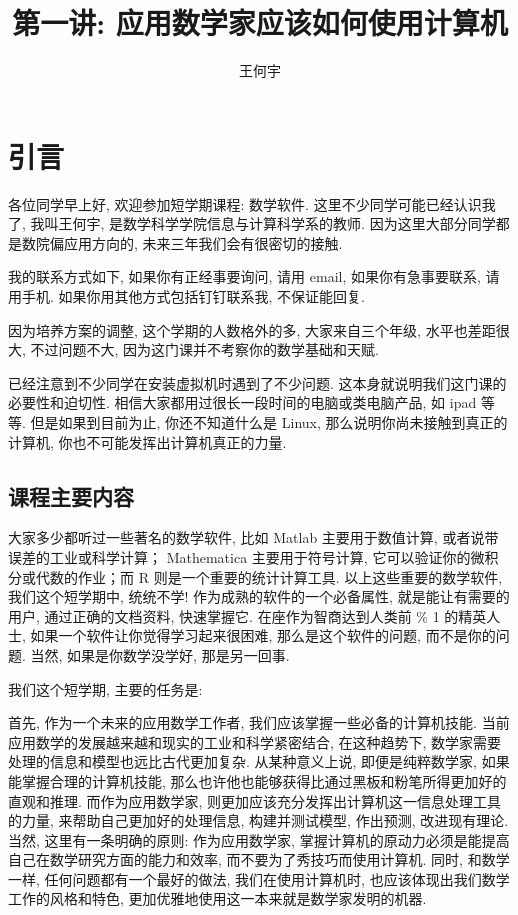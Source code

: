 \documentclass[a4paper]{ctexart}
\title{第一讲: 应用数学家应该如何使用计算机}
\author{王何宇}
\date{}
\begin{document}
\maketitle
\pagestyle{empty}

\section{引言}
各位同学早上好, 欢迎参加短学期课程: 数学软件. 这里不少同学可能已经认识我了,
我叫王何宇, 是数学科学学院信息与计算科学系的教师. 因为这里大部分同学都是数院偏应用方向的,
未来三年我们会有很密切的接触.

我的联系方式如下, 如果你有正经事要询问, 请用 email, 如果你有急事要联系, 请用手机.
如果你用其他方式包括钉钉联系我, 不保证能回复.   

因为培养方案的调整, 这个学期的人数格外的多, 大家来自三个年级, 水平也差距很大, 不过问题不大,
因为这门课并不考察你的数学基础和天赋.

已经注意到不少同学在安装虚拟机时遇到了不少问题. 这本身就说明我们这门课的必要性和迫切性.
相信大家都用过很长一段时间的电脑或类电脑产品, 如 ipad 等等. 但是如果到目前为止, 你还不知道什么是 Linux,
那么说明你尚未接触到真正的计算机, 你也不可能发挥出计算机真正的力量.

\subsection{课程主要内容}

大家多少都听过一些著名的数学软件, 比如 Matlab 主要用于数值计算, 或者说带误差的工业或科学计算；
Mathematica 主要用于符号计算, 它可以验证你的微积分或代数的作业；而 R 则是一个重要的统计计算工具.
以上这些重要的数学软件, 我们这个短学期中, 统统不学! 作为成熟的软件的一个必备属性, 就是能让有需要的用户,
通过正确的文档资料, 快速掌握它. 在座作为智商达到人类前 \% 1 的精英人士, 如果一个软件让你觉得学习起来很困难,
那么是这个软件的问题, 而不是你的问题. 当然, 如果是你数学没学好, 那是另一回事. 

我们这个短学期, 主要的任务是:

首先, 作为一个未来的应用数学工作者, 我们应该掌握一些必备的计算机技能.
当前应用数学的发展越来越和现实的工业和科学紧密结合, 在这种趋势下, 数学家需要处理的信息和模型也远比古代更加复杂.
从某种意义上说, 即便是纯粹数学家, 如果能掌握合理的计算机技能,
那么也许他也能够获得比通过黑板和粉笔所得更加好的直观和推理. 而作为应用数学家,
则更加应该充分发挥出计算机这一信息处理工具的力量, 来帮助自己更加好的处理信息, 构建并测试模型, 作出预测,
改进现有理论. 当然, 这里有一条明确的原则: 作为应用数学家,
掌握计算机的原动力必须是能提高自己在数学研究方面的能力和效率, 而不要为了秀技巧而使用计算机. 同时, 和数学一样,
任何问题都有一个最好的做法, 我们在使用计算机时, 也应该体现出我们数学工作的风格和特色,
更加优雅地使用这一本来就是数学家发明的机器.
\end{document}
